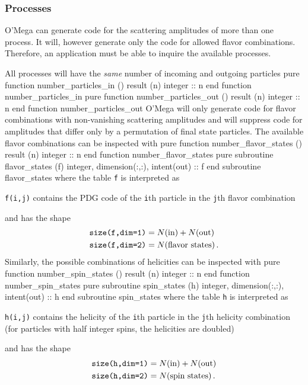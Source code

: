 \documentclass[12pt,a4paper]{article}
\newenvironment{files}%
 {\begin{list}{}%
   {\setlength{\leftmargin}{3em}%
    \setlength{\rightmargin}{3em}%
    \setlength{\itemindent}{1em}%
    \setlength{\listparindent}{0pt}%
    \settowidth{\labelwidth}{5em}%
    \renewcommand{\makelabel}[1]{\texttt{##1}}}}%
 {\end{list}}
\newenvironment{code}{\verbatim}{\endverbatim\noindent}
\begin{document}
\subsubsection{Processes}
O'Mega can generate code for the scattering amplitudes of more than
one process.  It will, however generate only the code for allowed
flavor combinations. Therefore, an application must be able to inquire
the available processes.

All processes will have the \emph{same} number of incoming and
outgoing particles
\begin{code}
  pure function number_particles_in () result (n)
    integer :: n
  end function number_particles_in
  pure function number_particles_out () result (n)
    integer :: n
  end function number_particles_out
\end{code}
O'Mega will only generate code for flavor combinations with
non-vanishing scattering amplitudes and will suppress code for
amplitudes that differ only by a permutation of final state particles.
The available flavor combinations can be inspected with
\begin{code}
  pure function number_flavor_states () result (n)
    integer :: n
  end function number_flavor_states
  pure subroutine flavor_states (f)
    integer, dimension(:,:), intent(out) :: f
  end subroutine flavor_states
\end{code}
where the table \verb+f+ is interpreted as
\begin{files}
  \item[\texttt{f(i,j)}] contains the PDG code of the \verb+i+th particle
    in the \verb+j+th flavor combination
\end{files}
and has the shape
\begin{align*}
  \text{\texttt{size(f,dim=1)}} &= N(\text{in}) + N(\text{out}) \\
  \text{\texttt{size(f,dim=2)}} &= N(\text{flavor states})\,.
\end{align*}
Similarly, the possible combinations of helicities can be inspected with
\begin{code}
  pure function number_spin_states () result (n)
    integer :: n
  end function number_spin_states
  pure subroutine spin_states (h)
    integer, dimension(:,:), intent(out) :: h
  end subroutine spin_states
\end{code}
where the table \verb+h+ is interpreted as
\begin{files}
  \item[\texttt{h(i,j)}] contains the helicity of the \verb+i+th particle
    in the \verb+j+th helicity combination (for particles with half
    integer spins, the helicities are doubled)
\end{files}
and has the shape
\begin{align*}
  \text{\texttt{size(h,dim=1)}} &= N(\text{in}) + N(\text{out}) \\
  \text{\texttt{size(h,dim=2)}} &= N(\text{spin states})\,.
\end{align*}
\end{document}
